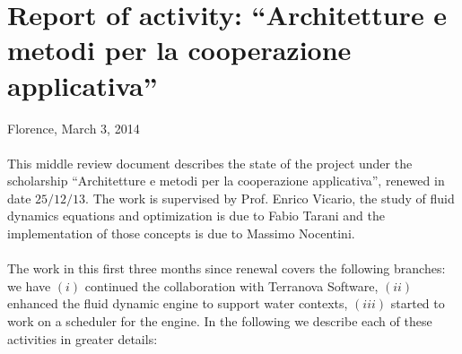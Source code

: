 \documentclass[twoside,openright,titlepage,fleqn,
headinclude,11pt,a4paper,BCOR5mm,footinclude ]{scrbook}
\begin{document}
\frenchspacing
\raggedbottom
{}
\pagestyle{plain}
%
\pagestyle{scrheadings}

\lstset{
	language = java
	, numbers = left 
	, basicstyle=\sffamily%
	, tabsize=2
	, captionpos=b
	, breaklines=true
	, showspaces=false
	, showstringspaces=false
}
\chapter*{Report of activity: ``Architetture e metodi per la 
cooperazione applicativa'' }
Florence, March 3, 2014
\\\\
This middle review document describes the state of the project under
the scholarship ``Architetture e metodi per la cooperazione
applicativa'', renewed in date $25/12/13$.  The work is supervised by
Prof. Enrico Vicario, the study of fluid dynamics equations and
optimization is due to Fabio Tarani and the implementation of those
concepts is due to Massimo Nocentini.
\\\\
The work in this first three months since renewal covers the following
branches: we have $(i)$ continued the collaboration with Terranova
Software, $(ii)$ enhanced the fluid dynamic engine to support water
contexts, $(iii)$ started to work on a scheduler for the engine. In
the following we describe each of these activities in greater details:
\end{document}
